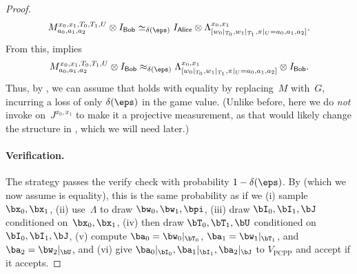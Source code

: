 \documentclass[11pt]{article}
\newcommand{\consistency}{\simeq}
\newcommand{\reg}[1]{{\mathsf{#1}}}
\begin{document}
\begin{proof}
\begin{equation}
M^{x_0, x_1, T_0, T_1, U}_{a_0, a_1, a_2} \otimes I_{\reg{Bob}}\consistency_{\delta(\eps)}
I_{\reg{Alice}} \otimes \Lambda^{x_0, x_1}_{[w_0|_{T_0}, w_1|_{T_1}, \pi|_{U} = a_0, a_1, a_2]}.
\end{equation}
From this,  implies
\begin{equation}\label{eq:gonna-use-this-once}
M^{x_0, x_1, T_0, T_1, U}_{a_0, a_1, a_2} \otimes I_{\reg{Bob}}\approx_{\delta(\eps)}
\Lambda^{x_0, x_1}_{[w_0|_{T_0}, w_1|_{T_1}, \pi|_{U} = a_0, a_1, a_2]} \otimes I_{\reg{Bob}}.
\end{equation}
Thus, by , we can assume that  holds with equality by replacing~$M$ with~$G$,
incurring a loss of only $\delta(\eps)$ in the game value.
(Unlike before, here we do \emph{not} invoke  on~$J^{x_0, x_1}$ to make it a projective measurement,
as that would likely change the structure in , which we will need later.)

\paragraph{Verification.}
The strategy passes the verify check with probability $1-\delta(\eps)$.  
By 
(which we now assume is equality),
this is the same probability as if we (i) sample~$\bx_0, \bx_1$,
(ii) use~$\Lambda$ to draw $\bw_0, \bw_1, \bpi$,
(iii) draw $\bI_0, \bI_1, \bJ$ conditioned on~$\bx_0, \bx_1$,
(iv) then draw $\bT_0, \bT_1, \bU$ conditioned on~$\bI_0, \bI_1, \bJ$,
(v) compute $\ba_0 = \bw_0|_{\bT_0}$, $\ba_1 = \bw_1|_{\bT_1}$, and $\ba_2 = \bw_2|_{\bU}$,
and (vi) give $\ba_0|_{\bI_0}, \ba_1|_{\bI_1}, \ba_2|_{\bJ}$ to $V_{\mathrm{PCPP}}$ and accept if it accepts.


\end{proof}
\end{document}
